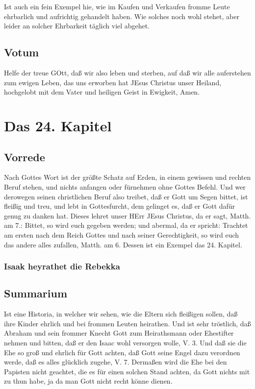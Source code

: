 Ist auch ein fein Exempel hie, wie im Kaufen und Verkaufen fromme Leute ehrbarlich und aufrichtig gehandelt haben. Wie solches noch wohl stehet, aber leider an solcher Ehrbarkeit täglich viel abgehet.

\section{Votum}

Helfe der treue GOtt, daß wir also leben und sterben, auf daß wir alle auferstehen zum ewigen Leben, das uns erworben hat JEsus Christus unser Heiland, hochgelobt mit dem Vater und heiligen Geist in Ewigkeit, Amen.

\chapter{Das 24. Kapitel}

\section{Vorrede}

Nach Gottes Wort ist der größte Schatz auf Erden, in einem gewissen und rechten Beruf stehen, und nichts anfangen oder fürnehmen ohne Gottes Befehl. Und wer derowegen seinen christlichen Beruf also treibet, daß er Gott um Segen bittet, ist fleißig und treu, und lebt in Gottesfurcht, dem gelinget es, daß er Gott dafür genug zu danken hat. Dieses lehret unser HErr JEsus Christus, da er sagt, Matth. am 7.: Bittet, so wird euch gegeben werden; und abermal, da er spricht: Trachtet am ersten nach dem Reich Gottes und nach seiner Gerechtigkeit, so wird euch das andere alles zufallen, Matth. am 6. Dessen ist ein Exempel das 24. Kapitel.

\subsection{Isaak heyrathet die Rebekka}

\section{Summarium}

Ist eine Historia, in welcher wir sehen, wie die Eltern sich fleißigen sollen, daß ihre Kinder ehrlich und bei frommen Leuten heirathen. Und ist sehr tröstlich, daß Abraham und sein frommer Knecht Gott zum Heirathsmann oder Ehestifter nehmen und bitten, daß er den Isaac wohl versorgen wolle, V. 3. Und daß sie die Ehe so groß und ehrlich für Gott achten, daß Gott seine Engel dazu verordnen werde, daß es alles glücklich zugehe, V. 7. Dermaßen wird die Ehe bei den Papisten nicht geachtet, die es für einen solchen Stand achten, da Gott nichts mit zu thun habe, ja da man Gott nicht recht könne dienen.

